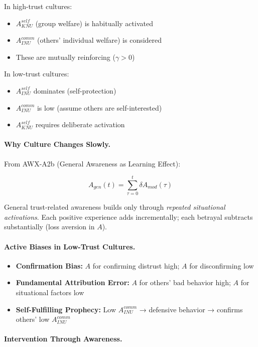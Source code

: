 In high-trust cultures:
\begin{itemize}
\item $A^{self}_{KNU}$ (group welfare) is habitually activated
\item $A^{comm}_{INU}$ (others' individual welfare) is considered
\item These are mutually reinforcing ($\gamma > 0$)
\end{itemize}

In low-trust cultures:
\begin{itemize}
\item $A^{self}_{INU}$ dominates (self-protection)
\item $A^{comm}_{INU}$ is low (assume others are self-interested)
\item $A^{self}_{KNU}$ requires deliberate activation
\end{itemize}

\paragraph{Why Culture Changes Slowly.}
From AWX-A2b (General Awareness as Learning Effect):

\begin{equation}
A_{gen}(t) = \sum_{\tau=0}^{t} \delta A_{mod}(\tau)
\end{equation}

General trust-related awareness builds only through \emph{repeated situational
activations}. Each positive experience adds incrementally; each betrayal 
subtracts substantially (loss aversion in $A$).

\paragraph{Active Biases in Low-Trust Cultures.}
\begin{itemize}
\item \textbf{Confirmation Bias:} $A$ for confirming distrust high; $A$ for 
disconfirming low
\item \textbf{Fundamental Attribution Error:} $A$ for others' bad behavior high;
$A$ for situational factors low
\item \textbf{Self-Fulfilling Prophecy:} Low $A^{comm}_{INU}$ → defensive 
behavior → confirms others' low $A^{comm}_{INU}$
\end{itemize}

\paragraph{Intervention Through Awareness.}

